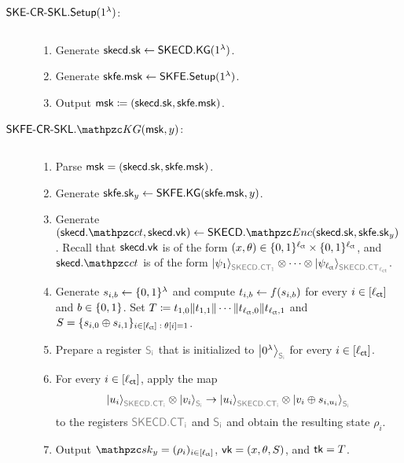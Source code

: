 \begin{description}

\item[$\mathsf{SKE}\textrm{-}\mathsf{CR}\textrm{-}\mathsf{SKL}.\mathsf{Setup}(1^\lambda)$:] $ $
\begin{enumerate}
    \item Generate $\mathsf{skecd}.\mathsf{sk}\leftarrow\mathsf{SKECD}.\mathsf{KG}(1^\lambda)$.
    \item Generate $\mathsf{skfe}.\mathsf{msk}\leftarrow\mathsf{SKFE}.\mathsf{Setup}(1^\lambda)$.
    \item Output $\mathsf{msk}\coloneqq(\mathsf{skecd}.\mathsf{sk}, \mathsf{skfe}.\mathsf{msk})$.
\end{enumerate}

\item[$\SKFESKL.\qKG(\msk,y)$:] $ $
\begin{enumerate}
    \item Parse $\mathsf{msk}=(\mathsf{skecd}.\mathsf{sk}, \mathsf{skfe}.\mathsf{msk})$.
    \item Generate $\mathsf{skfe}.\mathsf{sk}_y \leftarrow \mathsf{SKFE}.\mathsf{KG}(\mathsf{skfe}.\mathsf{msk},y)$.
    \item Generate
        $(\skecd.\qct,\skecd.\vk)\gets\SKECD.\qEnc(\skecd.\sk,\skfe.\sk_y)$.
        Recall that $\mathsf{skecd}.\mathsf{vk}$ is of the form
        $(x,\theta)\in\{0,1\}^{\ell_{\mathsf{ct}}}\times\{0,1\}^{\ell_{\mathsf{ct}}}$, and
        $\skecd.\qct$ is of the form
        $\ket{\psi_1}_{\qreg{SKECD.CT_1}}\tensor\cdots\tensor\ket{\psi_{\ctlen}}_{\qreg{SKECD.CT_{\ctlen}}}$.

    \item Generate $s_{i,b}\leftarrow\{0,1\}^\lambda$ and compute $t_{i,b}\leftarrow f(s_{i,b})$ for every $i\in[\ell_{\mathsf{ct}}]$ and $b\in\{0,1\}$. 
    Set $T\coloneqq
    t_{1,0}\|t_{1,1}\|\cdots\|t_{\ell_{\mathsf{ct}},0}\|t_{\ell_{\mathsf{ct}},1}$ and $S =
    \{s_{i,0} \oplus s_{i, 1}\}_{i \in [\ell_{\mathsf{ct}}] \; : \;\theta[i] =
    1}$.
    \item Prepare a register $\qreg{S_i}$ that is initialized to
    $\ket{0^\secp}_{\qreg{S_i}}$ for every $i\in[\ell_{\mathsf{ct}}]$. 
    \item For every $i\in[\ell_{\mathsf{ct}}]$, apply the map
    \begin{align}
    \ket{u_i}_{\qreg{SKECD.CT_i}}\tensor\ket{v_i}_{\qreg{S_i}}
    \ra
    \ket{u_i}_{\qreg{SKECD.CT_i}}\tensor\ket{v_i\oplus s_{i,u_i}}_{\qreg{S_i}}
    \end{align}
    to the registers $\qreg{SKECD.CT_i}$ and $\qreg{S_i}$ and obtain the resulting state $\rho_i$.
    \item Output $\qsk_y = (\rho_i)_{i\in{[\ctlen]}}$,
    $\mathsf{vk}=(x,\theta,S)$, and $\mathsf{tk}=T$.
\end{enumerate}


\end{description}
